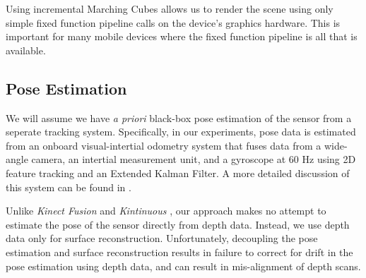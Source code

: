 \documentclass[10pt,twocolumn,letterpaper]{article}
\begin{document}
Using incremental Marching Cubes allows us to render the scene using only simple
fixed function pipeline calls on the device's graphics hardware. This is
important for many mobile devices where the fixed function pipeline is all that
is available. 

\subsection{Pose Estimation}
We will assume we  have \textit{a priori} black-box pose estimation of
the sensor from a seperate tracking system. Specifically, in our experiments,
pose data is estimated from an onboard visual-intertial odometry system that
fuses data from a wide-angle camera, an intertial measurement unit, and a
gyroscope at 60 Hz using 2D feature tracking and an Extended Kalman Filter. A
more detailed discussion of this system can be found in \cite{VINS}. 

Unlike \textit{Kinect Fusion} \cite{Newcombe} and \textit{Kintinuous}
\cite{Whelan2013}, our approach makes no attempt to estimate the pose of the
sensor directly from depth data. Instead, we use depth data only for surface
reconstruction. Unfortunately, decoupling the pose estimation and surface
reconstruction results in failure to correct for drift in the pose estimation
using depth data, and can result in mis-alignment of depth scans.

% 
% 
% 
% 
% 
\end{document}
